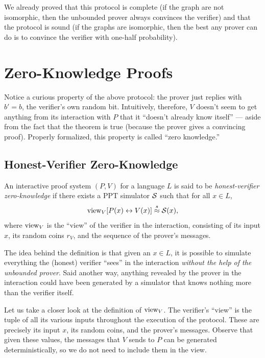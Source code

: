 \documentclass[11pt]{article}
\begin{document}
We already proved that this protocol is complete (if the graph are not
isomorphic, then the unbounded prover always convinces the verifier)
and that the protocol is sound (if the graphs are isomorphic, then the
best any prover can do is to convince the verifier with one-half
probability).

\section{Zero-Knowledge Proofs}
\label{sec:zero-knowl-proofs}

Notice a curious property of the above protocol: the prover just
replies with $b' = b$, the verifier's own random bit.  Intuitively,
therefore, $V$ doesn't seem to get anything from its interaction with
$P$ that it ``doesn't already know itself'' --- aside from the fact
that the theorem is true (because the prover gives a convincing
proof).  Properly formalized, this property is called ``zero
knowledge.''

\subsection{Honest-Verifier Zero-Knowledge}
\label{sec:honest-verifier-zero}

\begin{definition}
  \label{def:hvzk}
  An interactive proof system $(P,V)$ for a language $L$ is said to be
  \emph{honest-verifier zero-knowledge} if there exists a PPT
  simulator $\mathcal{S}$ such that for all $x \in L$, \[ \text{view}_{V}[ P(x)
  \leftrightarrow V(x) ] \stackrel{s}{\approx} \mathcal{S}(x), \] where $\text{view}_{V}$ is the
  ``view'' of the verifier in the interaction, consisting of its input
  $x$, its random coins $r_V$, and the sequence of the prover's
  messages.
\end{definition}

The idea behind the definition is that given an $x \in L$, it is
possible to simulate everything the (honest) verifier ``sees'' in the
interaction \emph{without the help of the unbounded prover}.  Said
another way, anything revealed by the prover in the interaction could
have been generated by a simulator that knows nothing more than the
verifier itself.

Let us take a closer look at the definition of $\text{view}_V$.  The
verifier's ``view'' is the tuple of all its various inputs throughout
the execution of the protocol.  These are precisely its input $x$, its
random coins, and the prover's messages.  Observe that given these
values, the messages that $V$ sends to $P$ can be generated
deterministically, so we do not need to include them in the view.
\end{document}
